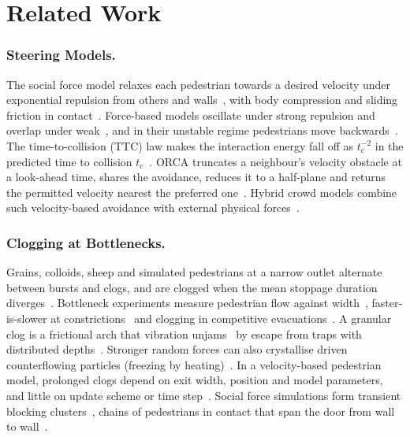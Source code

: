 \section{Related Work}\label{sec:background}
\subsubsection{Steering Models.}
The social force model relaxes each pedestrian towards a desired velocity under exponential repulsion from others and walls~\cite{helbing1995}, with body compression and sliding friction in contact~\cite{helbing2000nature}. Force-based models oscillate under strong repulsion and overlap under weak~\cite{chraibi2010}, and in their unstable regime pedestrians move backwards~\cite{chraibi2015}. The time-to-collision (TTC) law makes the interaction energy fall off as $t_c^{-2}$ in the predicted time to collision $t_c$~\cite{karamouzas2014}. ORCA truncates a neighbour's velocity obstacle at a look-ahead time, shares the avoidance, reduces it to a half-plane and returns the permitted velocity nearest the preferred one~\cite{vandenberg2011}. Hybrid crowd models combine such velocity-based avoidance with external physical forces~\cite{kim2015}.

\subsubsection{Clogging at Bottlenecks.}
Grains, colloids, sheep and simulated pedestrians at a narrow outlet alternate between bursts and clogs, and are clogged when the mean stoppage duration diverges~\cite{zuriguel2014}. Bottleneck experiments measure pedestrian flow against width~\cite{hoogendoorn2005,seyfried2009}, faster-is-slower at constrictions~\cite{pastor2015} and clogging in competitive evacuations~\cite{garcimartin2017}. A granular clog is a frictional arch that vibration unjams~\cite{janda2009} by escape from traps with distributed depths~\cite{nicolas2018trap}. Stronger random forces can also crystallise driven counterflowing particles (freezing by heating)~\cite{helbing2000freezing}. In a velocity-based pedestrian model, prolonged clogs depend on exit width, position and model parameters, and little on update scheme or time step~\cite{xu2021}. Social force simulations form transient blocking clusters~\cite{parisi2005microscopic,cornes2021microscopic}, chains of pedestrians in contact that span the door from wall to wall~\cite{cornes2021microscopic}.

